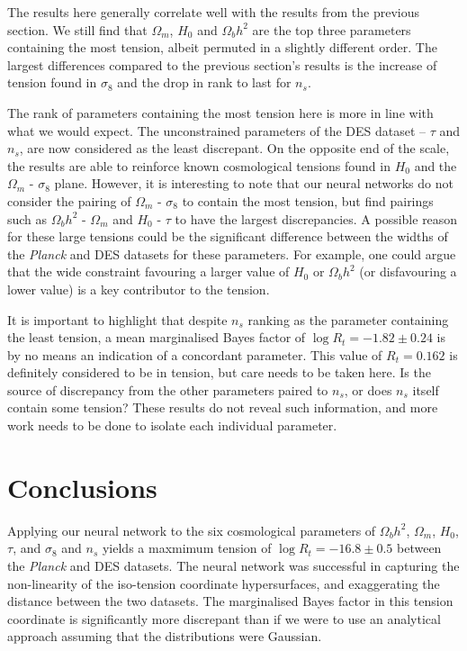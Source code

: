 \documentclass[%
 reprint,
 amsmath,amssymb,
 aps,
]{revtex4-2}
\begin{document}
The results here generally correlate well with the results from the previous section. We still find that $\Omega_m$, $H_0$ and $\Omega_b h^2$ are the top three parameters containing the most tension, albeit permuted in a slightly different order. The largest differences compared to the previous section's results is the increase of tension found in $\sigma_8$ and the drop in rank to last for $n_s$.

The rank of parameters containing the most tension here is more in line with what we would expect. The unconstrained parameters of the DES dataset -- $\tau$ and $n_s$, are now considered as the least discrepant. On the opposite end of the scale, the results are able to reinforce known cosmological tensions found in $H_0$ and the $\Omega_m$ - $\sigma_8$ plane. However, it is interesting to note that our neural networks do not consider the pairing of $\Omega_m$ - $\sigma_8$ to contain the most tension, but find pairings such as $\Omega_b h^2$ - $\Omega_m$ and $H_0$ - $\tau$ to have the largest discrepancies. A possible reason for these large tensions could be the significant difference between the widths of the \textit{Planck} and DES datasets for these parameters. For example, one could argue that the wide constraint favouring a larger value of $H_0$ or $\Omega_b h^2$ (or disfavouring a lower value) is a key contributor to the tension. 

It is important to highlight that despite $n_s$ ranking as the parameter containing the least tension, a mean marginalised Bayes factor of $\log R_t = -1.82 \pm 0.24$ is by no means an indication of a concordant parameter. This value of $R_t = 0.162$ is definitely considered to be in tension, but care needs to be taken here. Is the source of discrepancy from the other parameters paired to $n_s$, or does $n_s$ itself contain some tension? These results do not reveal such information, and more work needs to be done to isolate each individual parameter.


\section{Conclusions}

Applying our neural network to the six cosmological parameters of $\Omega_b h^2$, $\Omega_m$, $H_0$, $\tau$, and $\sigma_8$ and $n_s$ yields a maxmimum tension of $\log R_t = -16.8 \pm 0.5$ between the \textit{Planck} and DES datasets. The neural network was successful in capturing the non-linearity of the iso-tension coordinate hypersurfaces, and exaggerating the distance between the two datasets. The marginalised Bayes factor in this tension coordinate is significantly more discrepant than if we were to use an analytical approach assuming that the distributions were Gaussian.
\end{document}
